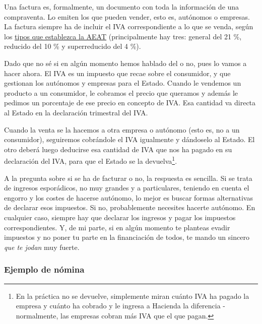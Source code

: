 \documentclass[nochap,palatino,shortheader]{apuntes}
\begin{document}
Una factura es, formalmente, un documento con toda la información de una compraventa. Lo emiten los que pueden vender, esto es, autónomos o empresas. La factura siempre ha de incluir el IVA correspondiente a lo que se venda, según los \href{http://www.agenciatributaria.es/static_files/AEAT/Contenidos_Comunes/La_Agencia_Tributaria/Segmentos_Usuarios/Empresas_y_profesionales/Novedades_IVA_2014/Nuevos_tipos_IVA.pdf}{tipos que establezca la AEAT} (principalmente hay tres: general del 21 \%, reducido del 10 \% y superreducido del 4 \%).

Dado que no sé si en algún momento hemos hablado del  o no, pues lo vamos a hacer ahora. El IVA es un impuesto que recae sobre el consumidor, y que gestionan los autónomos y empresas para el Estado. Cuando le vendemos un producto a un consumidor, le cobramos el precio que queramos y además le pedimos un porcentaje de ese precio en concepto de IVA. Esa cantidad va directa al Estado en la declaración trimestral del IVA.

Cuando la venta se la hacemos a otra empresa o autónomo (esto es, no a un consumidor), seguiremos cobrándole el IVA igualmente y dándoselo al Estado. El otro deberá luego deducirse esa cantidad de IVA que nos ha pagado en su declaración del IVA, para que el Estado se la devuelva\footnote{En la práctica no se devuelve, simplemente miran cuánto IVA ha pagado la empresa y cuánto ha cobrado y le ingresa a Hacienda la diferencia - normalmente, las empresas cobran más IVA que el que pagan.}.

A la pregunta sobre si se ha de facturar o no, la respuesta es sencilla. Si se trata de ingresos esporádicos, no muy grandes y a particulares, teniendo en cuenta el engorro y los costes de hacerse autónomo, lo mejor es buscar formas alternativas de declarar esos impuestos. Si no, probablemente necesites hacerte autónomo. En cualquier caso, siempre hay que declarar los ingresos y pagar los impuestos correspondientes. Y, de mi parte, si en algún momento te planteas evadir impuestos y no poner tu parte en la financiación de todos, te mando un sincero \textit{que te jodan} muy fuerte.

\subsubsection{Ejemplo de nómina}
\end{document}
